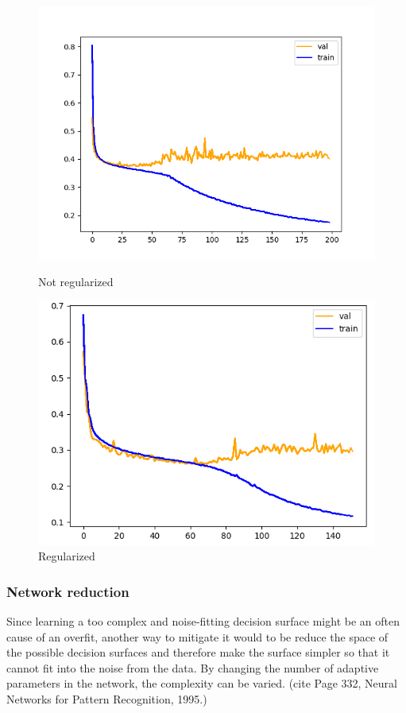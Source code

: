 \begin{figure}[htb]
    \centering
    \begin{minipage}{.5\textwidth}
      \centering
      \includegraphics[width=\linewidth]{bilder/firt-train-overfit.png}
      \caption{Not regularized}
      \label{fig:first-train-overfit}
    \end{minipage}%
    \begin{minipage}{.5\textwidth}
      \centering
      \includegraphics[width=\linewidth]{bilder/first-train-regularized.png}
      \caption{Regularized}
      \label{fig:first-train-regularized}
    \end{minipage}
\end{figure}

\subsubsection{Network reduction}
Since learning a too complex and noise-fitting decision surface might be an often cause of an overfit, another way to mitigate it would to be reduce the space of the possible decision surfaces and therefore make the surface simpler so that it cannot fit into the noise from the data. By changing the number of adaptive parameters in the network, the complexity can be varied. (cite Page 332, Neural Networks for Pattern Recognition, 1995.)

